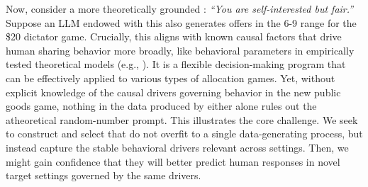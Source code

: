 Now, consider a more theoretically grounded \persona{}: \emph{``You are self-interested but fair.''}
Suppose an LLM endowed with this \persona{} also generates offers in the 6-9 range for the \$20 dictator game.
Crucially, this \persona{} aligns with known causal factors that drive human sharing behavior more broadly, like behavioral parameters in empirically tested theoretical models (e.g., \cite{charness2002understanding}).
It is a flexible decision-making program that can be effectively applied to various types of allocation games.
Yet, without explicit knowledge of the causal drivers governing behavior in the new public goods game, nothing in the data produced by either \persona{} alone rules out the atheoretical random-number prompt.
This illustrates the core challenge.
We seek to construct and select  that do not overfit to a single data-generating process, but instead capture the stable behavioral drivers relevant across settings.
Then, we might gain confidence that they will better predict human responses in novel target settings governed by the same drivers.
